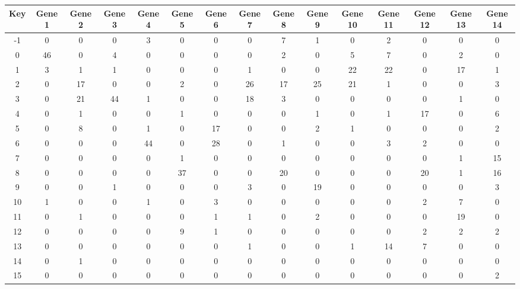 \begin{tabular}{|c|c|c|c|c|c|c|c|c|c|c|c|c|c|c|}
\hline
Key & Gene 1 & Gene 2 & Gene 3 & Gene 4 & Gene 5 & Gene 6 & Gene 7 & Gene 8 & Gene 9 & Gene 10 & Gene 11 & Gene 12 & Gene 13 & Gene 14 \\
\hline
-1 & 0 & 0 & 0 & 3 & 0 & 0 & 0 & 7 & 1 & 0 & 2 & 0 & 0 & 0 \\
0 & 46 & 0 & 4 & 0 & 0 & 0 & 0 & 2 & 0 & 5 & 7 & 0 & 2 & 0 \\
1 & 3 & 1 & 1 & 0 & 0 & 0 & 1 & 0 & 0 & 22 & 22 & 0 & 17 & 1 \\
2 & 0 & 17 & 0 & 0 & 2 & 0 & 26 & 17 & 25 & 21 & 1 & 0 & 0 & 3 \\
3 & 0 & 21 & 44 & 1 & 0 & 0 & 18 & 3 & 0 & 0 & 0 & 0 & 1 & 0 \\
4 & 0 & 1 & 0 & 0 & 1 & 0 & 0 & 0 & 1 & 0 & 1 & 17 & 0 & 6 \\
5 & 0 & 8 & 0 & 1 & 0 & 17 & 0 & 0 & 2 & 1 & 0 & 0 & 0 & 2 \\
6 & 0 & 0 & 0 & 44 & 0 & 28 & 0 & 1 & 0 & 0 & 3 & 2 & 0 & 0 \\
7 & 0 & 0 & 0 & 0 & 1 & 0 & 0 & 0 & 0 & 0 & 0 & 0 & 1 & 15 \\
8 & 0 & 0 & 0 & 0 & 37 & 0 & 0 & 20 & 0 & 0 & 0 & 20 & 1 & 16 \\
9 & 0 & 0 & 1 & 0 & 0 & 0 & 3 & 0 & 19 & 0 & 0 & 0 & 0 & 3 \\
10 & 1 & 0 & 0 & 1 & 0 & 3 & 0 & 0 & 0 & 0 & 0 & 2 & 7 & 0 \\
11 & 0 & 1 & 0 & 0 & 0 & 1 & 1 & 0 & 2 & 0 & 0 & 0 & 19 & 0 \\
12 & 0 & 0 & 0 & 0 & 9 & 1 & 0 & 0 & 0 & 0 & 0 & 2 & 2 & 2 \\
13 & 0 & 0 & 0 & 0 & 0 & 0 & 1 & 0 & 0 & 1 & 14 & 7 & 0 & 0 \\
14 & 0 & 1 & 0 & 0 & 0 & 0 & 0 & 0 & 0 & 0 & 0 & 0 & 0 & 0 \\
15 & 0 & 0 & 0 & 0 & 0 & 0 & 0 & 0 & 0 & 0 & 0 & 0 & 0 & 2 \\
\hline
\end{tabular}